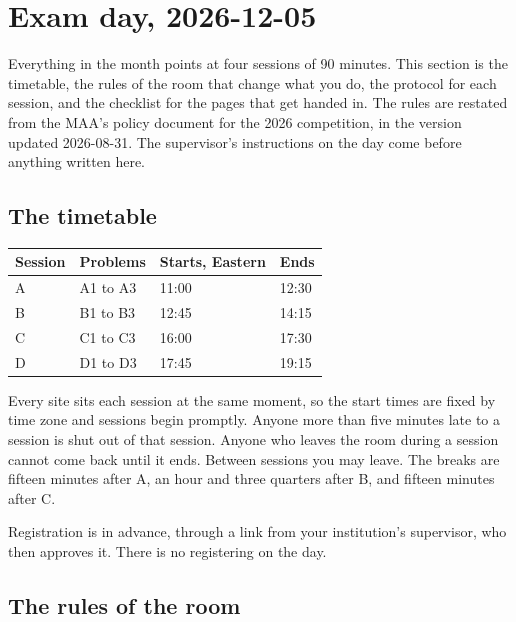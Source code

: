 \section{Exam day, 2026-12-05}
\label{sec:examday}

Everything in the month points at four sessions of 90 minutes. This section is the timetable, the rules of the room that change what you do, the protocol for each session, and the checklist for the pages that get handed in. The rules are restated from the MAA's policy document for the 2026 competition, in the version updated 2026-08-31. The supervisor's instructions on the day come before anything written here.

\subsection*{The timetable}

\begin{center}\small
\begin{tabular}{llll}
\toprule
Session & Problems & Starts, Eastern & Ends \\
\midrule
A & A1 to A3 & 11:00 & 12:30 \\
B & B1 to B3 & 12:45 & 14:15 \\
C & C1 to C3 & 16:00 & 17:30 \\
D & D1 to D3 & 17:45 & 19:15 \\
\bottomrule
\end{tabular}
\end{center}

Every site sits each session at the same moment, so the start times are fixed by time zone and sessions begin promptly. Anyone more than five minutes late to a session is shut out of that session. Anyone who leaves the room during a session cannot come back until it ends. Between sessions you may leave. The breaks are fifteen minutes after A, an hour and three quarters after B, and fifteen minutes after C.

Registration is in advance, through a link from your institution's supervisor, who then approves it. There is no registering on the day.

\subsection*{The rules of the room}

